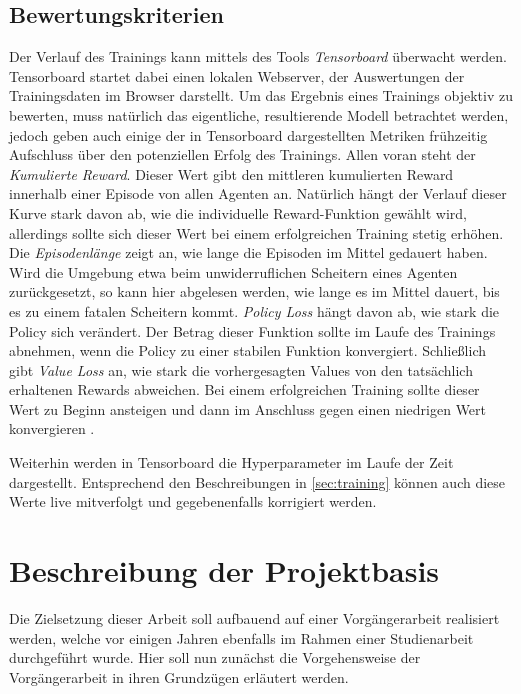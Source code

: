 \subsection{Bewertungskriterien}
Der Verlauf des Trainings kann mittels des Tools \emph{Tensorboard} überwacht werden.
Tensorboard startet dabei einen lokalen Webserver, der Auswertungen der Trainingsdaten im Browser darstellt.
Um das Ergebnis eines Trainings objektiv zu bewerten, muss natürlich das eigentliche, resultierende Modell betrachtet werden, jedoch geben auch einige der in Tensorboard dargestellten Metriken frühzeitig Aufschluss über den potenziellen Erfolg des Trainings.
Allen voran steht der \emph{Kumulierte Reward}.
Dieser Wert gibt den mittleren kumulierten Reward innerhalb einer Episode von allen Agenten an.
Natürlich hängt der Verlauf dieser Kurve stark davon ab, wie die individuelle Reward-Funktion gewählt wird, allerdings sollte sich dieser Wert bei einem erfolgreichen Training stetig erhöhen.
Die \emph{Episodenlänge} zeigt an, wie lange die Episoden im Mittel gedauert haben.
Wird die Umgebung etwa beim unwiderruflichen Scheitern eines Agenten zurückgesetzt, so kann hier abgelesen werden, wie lange es im Mittel dauert, bis es zu einem fatalen Scheitern kommt.
\emph{Policy Loss} hängt davon ab, wie stark die Policy sich verändert.
Der Betrag dieser Funktion sollte im Laufe des Trainings abnehmen, wenn die Policy zu einer stabilen Funktion konvergiert.
Schließlich gibt \emph{Value Loss} an, wie stark die vorhergesagten Values von den tatsächlich erhaltenen Rewards abweichen.
Bei einem erfolgreichen Training sollte dieser Wert zu Beginn ansteigen und dann im Anschluss gegen einen niedrigen Wert konvergieren \cite{aurelian2018,untiyMetrics}.

Weiterhin werden in Tensorboard die Hyperparameter im Laufe der Zeit dargestellt.
Entsprechend den Beschreibungen in \autoref{sec:training} können auch diese Werte live mitverfolgt und gegebenenfalls korrigiert werden.

\section{Beschreibung der Projektbasis}
Die Zielsetzung dieser Arbeit soll aufbauend auf einer Vorgängerarbeit \cite{waidner.2020} realisiert werden, welche vor einigen Jahren ebenfalls im Rahmen einer Studienarbeit durchgeführt wurde.
Hier soll nun zunächst die Vorgehensweise der Vorgängerarbeit in ihren Grundzügen erläutert werden.

